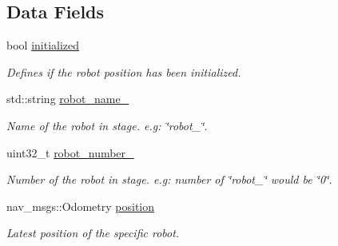 \subsection*{Data Fields}
\begin{DoxyCompactItemize}
\item 
\hypertarget{classPositionSubscriber_ae81bd51f15be89dab69a1c08f78d75de}{bool \hyperlink{classPositionSubscriber_ae81bd51f15be89dab69a1c08f78d75de}{initialized}}\label{classPositionSubscriber_ae81bd51f15be89dab69a1c08f78d75de}

\begin{DoxyCompactList}\small\item\em Defines if the robot position has been initialized. \end{DoxyCompactList}\item 
\hypertarget{classPositionSubscriber_a7c455ff17b92a26ca0e9d68067d5a96c}{std\-::string \hyperlink{classPositionSubscriber_a7c455ff17b92a26ca0e9d68067d5a96c}{robot\-\_\-name\-\_\-}}\label{classPositionSubscriber_a7c455ff17b92a26ca0e9d68067d5a96c}

\begin{DoxyCompactList}\small\item\em Name of the robot in stage. e.\-g\-: \char`\"{}robot\-\_\char`\"{}. \end{DoxyCompactList}\item 
\hypertarget{classPositionSubscriber_a265369dc434d3fc7133eee13058db036}{uint32\-\_\-t \hyperlink{classPositionSubscriber_a265369dc434d3fc7133eee13058db036}{robot\-\_\-number\-\_\-}}\label{classPositionSubscriber_a265369dc434d3fc7133eee13058db036}

\begin{DoxyCompactList}\small\item\em Number of the robot in stage. e.\-g\-: number of \char`\"{}robot\-\_\char`\"{} would be \char`\"{}0\char`\"{}. \end{DoxyCompactList}\item 
\hypertarget{classPositionSubscriber_a6294488a471fddf065020e42d0671a23}{nav\-\_\-msgs\-::\-Odometry \hyperlink{classPositionSubscriber_a6294488a471fddf065020e42d0671a23}{position}}\label{classPositionSubscriber_a6294488a471fddf065020e42d0671a23}

\begin{DoxyCompactList}\small\item\em Latest position of the specific robot. \end{DoxyCompactList}\end{DoxyCompactItemize}


